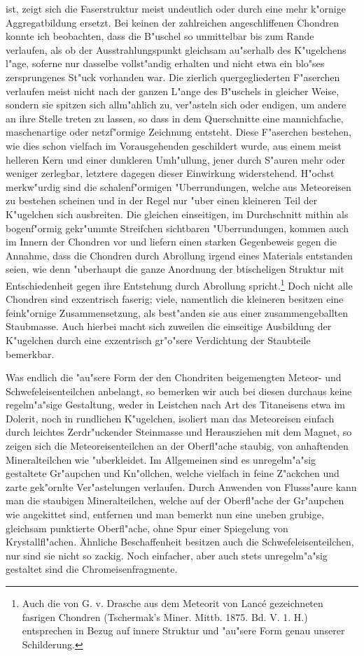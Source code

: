 \documentclass[a4paper, 11pt, oneside]{article}
\begin{document}
ist, zeigt sich die Faserstruktur meist undeutlich oder durch eine mehr k"ornige Aggregatbildung ersetzt. Bei keinen der zahlreichen angeschliffenen Chondren konnte ich beobachten, dass die B"uschel so unmittelbar bis zum Rande verlaufen, als ob der Ausstrahlungspunkt gleichsam au"serhalb des K"ugelchens l"age, soferne nur dasselbe vollst"andig erhalten und nicht etwa ein blo"ses zersprungenes St"uck vorhanden war. Die zierlich quergegliederten F"aserchen verlaufen meist nicht nach der ganzen L"ange des B"uschels in gleicher Weise, sondern sie spitzen sich allm"ahlich zu, ver"asteln sich oder endigen, um andere an ihre Stelle treten zu lassen, so dass in dem Querschnitte eine mannichfache, maschenartige oder netzf"ormige Zeichnung entsteht. Diese F"aserchen bestehen, wie dies schon vielfach im Vorausgehenden geschildert wurde, aus einem meist helleren Kern und einer dunkleren Umh"ullung, jener durch S"auren mehr oder weniger zerlegbar, letztere dagegen dieser Einwirkung widerstehend. H"ochst merkw"urdig sind die schalenf"ormigen "Uberrundungen, welche aus Meteoreisen zu bestehen scheinen und in der Regel nur "uber einen kleineren Teil der K"ugelchen sich ausbreiten. Die gleichen einseitigen, im Durchschnitt mithin als bogenf"ormig gekr"ummte Streifchen sichtbaren "Uberrundungen, kommen auch im Innern der Chondren vor und liefern einen starken Gegenbeweis gegen die Annahme, dass die Chondren durch Abrollung irgend eines Materials entstanden seien, wie denn "uberhaupt die ganze Anordnung der btischeligen Struktur mit Entschiedenheit gegen ihre Entstehung durch Abrollung spricht.\footnote{Auch die von G. v. Drasche aus dem Meteorit von Lancé gezeichneten fasrigen Chondren (Tschermak's Miner. Mittb. 1875. Bd. V. 1. H.) entsprechen in Bezug auf innere Struktur und "au"sere Form genau unserer Schilderung.} Doch nicht alle Chondren sind exzentrisch faserig; viele, namentlich die kleineren besitzen eine feink"ornige Zusammensetzung, als best"anden sie aus einer zusammengeballten Staubmasse. Auch hierbei macht sich zuweilen die einseitige Ausbildung der K"ugelchen durch eine exzentrisch gr"o"sere Verdichtung der Staubteile bemerkbar.

Was endlich die "au"sere Form der den Chondriten beigemengten Meteor- und Schwefeleisenteilchen anbelangt, so bemerken wir auch bei diesen durchaus keine regelm"a"sige Gestaltung, weder in Leistchen nach Art des Titaneisens etwa im Dolerit, noch in rundlichen K"ugelchen, isoliert man das Meteoreisen einfach durch leichtes Zerdr"uckender Steinmasse und Herausziehen mit dem Magnet, so zeigen sich die Meteoreisenteilchen an der Oberfl"ache staubig, von anhaftenden Mineralteilchen wie "uberkleidet. Im Allgemeinen sind es unregelm"a"sig gestaltete Gr"aupchen und Kn"ollchen, welche vielfach in feine Z"ackchen und zarte gek"ornlte Ver"astelungen verlaufen. Durch Anwenden von Flusss"aure kann man die staubigen Mineralteilchen, welche auf der Oberfl"ache der Gr"aupchen wie angekittet sind, entfernen und man bemerkt nun eine uneben grubige, gleichsam punktierte Oberfl"ache, ohne Spur einer Spiegelung von Krystallfl"achen. Ähnliche Beschaffenheit besitzen auch die Schwefeleisenteilchen, nur sind sie nicht so zackig. Noch einfacher, aber auch stets unregelm"a"sig gestaltet sind die Chromeisenfragmente.
\end{document}
